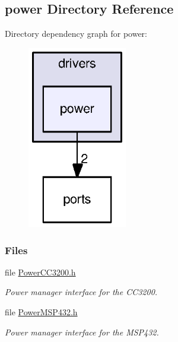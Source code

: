 \subsection{power Directory Reference}
\label{dir_bd6b5667c675ef84f92abadb1342ff53}
Directory dependency graph for power\+:
\nopagebreak
\begin{figure}[H]
\begin{center}
\leavevmode
\includegraphics[width=123pt]{dir_bd6b5667c675ef84f92abadb1342ff53_dep}
\end{center}
\end{figure}
\subsubsection*{Files}
\begin{DoxyCompactItemize}
\item 
file \hyperlink{_power_c_c3200_8h}{Power\+C\+C3200.\+h}
\begin{DoxyCompactList}\small\item\em Power manager interface for the C\+C3200. \end{DoxyCompactList}\item 
file \hyperlink{_power_m_s_p432_8h}{Power\+M\+S\+P432.\+h}
\begin{DoxyCompactList}\small\item\em Power manager interface for the M\+S\+P432. \end{DoxyCompactList}\end{DoxyCompactItemize}
